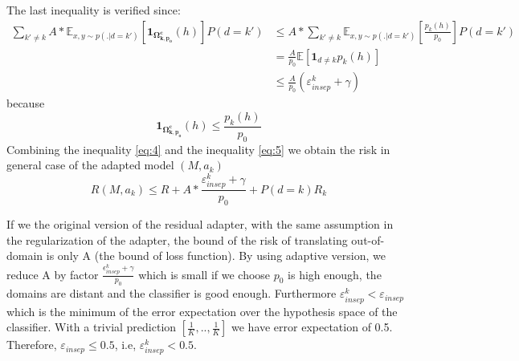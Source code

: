 \documentclass[12pt,a4paper,twoside]{report}
\theoremstyle{definition}
\newcommand{\fyTodo}[1]{\Todo[FY:]{\textcolor{orange}{#1}}}
\begin{document}
The last inequality is verified since:
\begin{equation}
\begin{split}
\displaystyle{\mathop{\sum}_{k' \neq k}} A * \mathbb{E}_{x,y \sim p(.|d=k')} [\mathbf{1}_{\mathbf{\Omega_{k,p_{0}}^{c}}} (h)]P(d=k') &\leq A * \displaystyle{\mathop{\sum}_{k' \neq k}} \mathbb{E}_{x,y \sim p(.|d=k') } [\frac{p_k(h)}{p_0}]P(d=k') \\
		& = \frac{A}{p_0} \mathbb{E}[\mathbf{1}_{d\neq k}p_k(h)] \\
		& \leq \frac{A}{p_0} (\mathbb{\varepsilon}_{insep}^k + \gamma)
\end{split}
\end{equation}
because
$$ \mathbf{1}_{\mathbf{\Omega_{k,p_{0}}^{c}}}(h) \leq \frac{p_k(h)}{p_0} $$
Combining the inequality \ref{eq:4} and the inequality \ref{eq:5} we obtain the risk in general case of the adapted model $(M,a_k)$ $$R(M,a_k) \leq R + A * \frac{\mathbb{\varepsilon}_{insep}^k + \gamma}{p_0} + P(d=k)R_k$$

If we the original version of the residual adapter, with the same assumption in the regularization of the adapter, the bound of the risk of translating out-of-domain is only A (the bound of loss function). By using adaptive version, we reduce A by factor $\frac{\epsilon^k_{insep}+\gamma}{p_0}$ which is small if we choose $p_0$ is high enough, the domains are distant and the classifier is good enough. Furthermore $ \varepsilon^k_{insep} < \varepsilon_{insep} $ which is the minimum of the error expectation over the hypothesis space of the classifier. With a trivial prediction $[\frac{1}{K},..,\frac{1}{K}]$ we have error expectation of 0.5. Therefore, $\varepsilon_{insep} \leq 0.5$, i.e, $\varepsilon^k_{insep} < 0.5$.
\fyTodo{I sort of buy the equations but then so what ? We should may be compare with non-adaptive ?}
\end{document}
